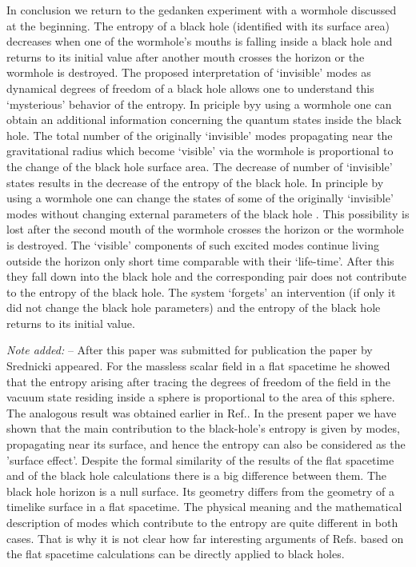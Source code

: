 \documentclass[superscriptaddress,showpacs,preprintnumbers,amsmath,amssymb,
nofootinbib,twocolumn,aps,prd,10pt]{revtex4-1}
\begin{document}
In conclusion  we return  to the  gedanken experiment  with a wormhole
\cite{FrNo:93} discussed at the beginning.  The entropy of a black hole
(identified with  its surface area)  decreases when  one of  the wormhole's
mouths is falling inside a black hole and returns to its initial value
after another mouth crosses the horizon or the wormhole is destroyed.
The proposed interpretation of `invisible' modes  as dynamical  degrees
of freedom of  a black hole allows one to  understand this `mysterious'
behavior of the entropy. In priciple byy using a wormhole one can obtain an
additional information concerning the quantum  states  inside  the  black
hole.  The  total number  of the originally `invisible' modes
propagating near the gravitational radius which become `visible' via
the wormhole is proportional to the  change of the black hole surface
area. The decrease of number of  `invisible' states results in the
decrease of the entropy of the black hole.  In principle  by using  a
wormhole  one can  change the states of some of the originally
`invisible' modes without changing external parameters of the black hole
\cite{note4}. This
possibility is lost after the second mouth of the wormhole crosses the
horizon or the wormhole is destroyed. The `visible' components  of such
excited modes continue living outside the horizon only short time
comparable with their `life-time'. After this they fall down into  the
black  hole  and  the corresponding  pair  does  not contribute to the
entropy of the black hole. The system `forgets' an intervention  (if
only  it did  not  change  the black hole parameters) and  the entropy
of the  black hole  returns to  its initial value.

\vspace{.5cm}
{\em Note added:} -- After this paper was submitted for publication the
paper by Srednicki \cite{Sred:93} appeared. For the massless scalar
field in a flat spacetime he showed that the entropy
arising after tracing the degrees of freedom of the field in the vacuum
state residing inside a sphere is proportional to the area of this sphere.
The analogous result was obtained earlier in Ref.\cite{BoKoLeSo:86}.
In the present paper we have shown that the main contribution to the
black-hole's entropy is given by modes, propagating near its surface,
and hence the entropy can also be considered as the 'surface effect'.
Despite the formal similarity of the results of the flat spacetime
and of the black hole calculations there is a big difference between them.
The black hole horizon is a null surface.
Its geometry differs from the geometry of a timelike surface in a flat
spacetime.
The physical meaning and the mathematical description of modes which
contribute
to the entropy are quite different in both cases.
That is why it is not clear how far interesting arguments of
Refs.\cite{Sred:93,BoKoLeSo:86}
based on the flat spacetime calculations can be
directly applied to black holes.
\end{document}
